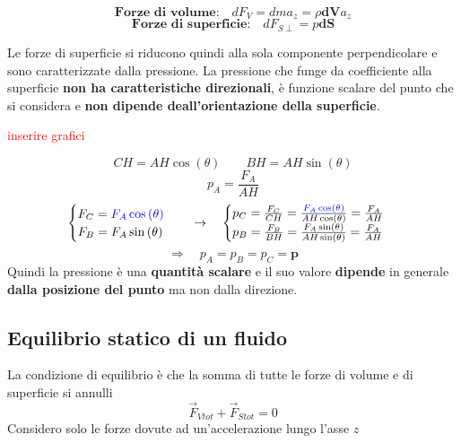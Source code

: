 \documentclass[x11names]{report}
\begin{document}
	\[ 
	\textbf{Forze di volume:} \quad dF_V = dma_z = \rho \boldsymbol{dV}a_z
	\]
	\[ 
	\textbf{Forze di superficie:} \quad dF_{S\perp} = p\boldsymbol{dS}
	\]
	
	\noindent
	Le forze di superficie si riducono quindi alla sola componente perpendicolare e sono caratterizzate dalla pressione. La pressione che funge da coefficiente alla superficie \textbf{non ha caratteristiche direzionali}, è funzione scalare del punto che si considera e \textbf{non dipende deall'orientazione della superficie}.
	
	\begin{center}
		\textcolor{red}{inserire grafici}
	\end{center}
	\[ 
	\boxed{CH = AH \cos\left(\theta\right)} \qquad \boxed{BH = AH \sin\left(\theta\right)}
	\]
	\[ 
	p_A = \frac{F_A}{AH}
	\]
	\[ 
	\begin{cases}
		F_C = \textcolor{blue}{F_A \cos\left(\theta\right)}\\
		F_B = F_A \sin\left(\theta\right)
	\end{cases} \quad \to \quad
	\begin{cases}
		p_C = \frac{F_C}{CH} = \frac{\textcolor{blue}{F_A \cos\left(\theta\right)}}{AH \cos\left(\theta\right)} = \frac{F_A}{AH} \\
		p_B = \frac{F_B}{BH} = \frac{F_A \sin\left(\theta\right)}{AH \sin\left(\theta\right)} = \frac{F_A}{AH}
	\end{cases}
	\]
	\[ 
	\Longrightarrow\quad p_A = p_B = p_C =\boldsymbol{p}
	\]
	Quindi la pressione è una \textbf{quantità scalare} e il suo valore \textbf{dipende} in generale \textbf{dalla posizione del punto} ma non dalla direzione.
	
	
	\subsection{Equilibrio statico di un fluido}
	La condizione di equilibrio è che la somma di tutte le forze di volume e di superficie si annulli
	\[ 
	\overrightarrow{F}_{Vtot} + \overrightarrow{F}_{Stot} = 0
	\]
	Considero solo le forze dovute ad un'accelerazione lungo l'asse \(z\)
	
\end{document}
